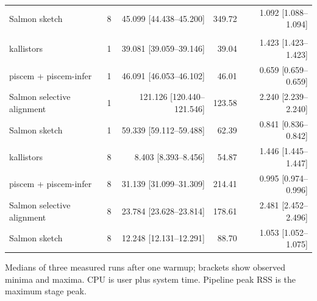 \begin{longtable}{@{}lrrrr@{}}
Salmon sketch & 8 & 45.099 [44.438--45.200] & 349.72 & 1.092 [1.088--1.094] \\
\addlinespace
\multicolumn{5}{@{}l}{\textit{fragment-truth-se}} \\
kallistors & 1 & 39.081 [39.059--39.146] & 39.04 & 1.423 [1.423--1.423] \\
piscem + piscem-infer & 1 & 46.091 [46.053--46.102] & 46.01 & 0.659 [0.659--0.659] \\
Salmon selective alignment & 1 & 121.126 [120.440--121.546] & 123.58 & 2.240 [2.239--2.240] \\
Salmon sketch & 1 & 59.339 [59.112--59.488] & 62.39 & 0.841 [0.836--0.842] \\
kallistors & 8 & 8.403 [8.393--8.456] & 54.87 & 1.446 [1.445--1.447] \\
piscem + piscem-infer & 8 & 31.139 [31.099--31.309] & 214.41 & 0.995 [0.974--0.996] \\
Salmon selective alignment & 8 & 23.784 [23.628--23.814] & 178.61 & 2.481 [2.452--2.496] \\
Salmon sketch & 8 & 12.248 [12.131--12.291] & 88.70 & 1.053 [1.052--1.075] \\
\end{longtable}
\noindent\footnotesize Medians of three measured runs after one warmup; brackets show observed minima and maxima. CPU is user plus system time. Pipeline peak RSS is the maximum stage peak.
\endgroup
